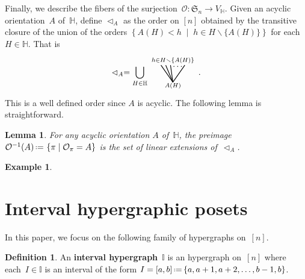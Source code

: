 \documentclass[reqno]{amsart}
\newtheorem{lemma}[theorem]{Lemma}
\theoremstyle{definition}
\newtheorem{definition}[theorem]{Definition}
\newtheorem{example}[theorem]{Example}
\newcommand{\set}[2]{\left\{ #1 \;\middle|\; #2 \right\}} %
\newcommand{\ssm}{\smallsetminus} %
\newcommand{\eqdef}{\mbox{\,\raisebox{0.2ex}{\scriptsize\ensuremath{\mathrm:}}\ensuremath{=}\,}} %
\newcommand{\defn}[1]{\textbf{\textsf{\color{PineGreen} #1}}} %
\newcommand{\vincent}[1]{\todo[size=\tiny,color=blue!30]{ #1 \\ \hfill --- V.}\,}
\newcommand{\fS}{\mathfrak{S}} %
\newcommand{\less}{\vartriangleleft} %
\newcommand{\Or}{\mathcal O}  %
\newcommand{\HH}{\mathbb H}  %
\newcommand{\II}{\mathbb I} %
\begin{document}
Finally, we describe the fibers of the surjection~$\Or : \fS_n \to V_\HH$.
Given an acyclic orientation~$A$ of~$\HH$, define $\less_A$ as the order on $[n]$ obtained by the transitive closure of the union of the \linebreak orders $\set{A(H) < h}{h \in H \ssm \{A(H)\}}$ for each $H \in \HH$.
That is
\[
	\less_A =  \bigcup_{H \in \HH} 
	\begin{tikzpicture}[scale=1,baseline=.0cm]
		\node at (0,-.45) {$\scriptstyle A(H)$};
		\node at (0,.6) {$\scriptstyle h \in H \ssm \{A(H)\}$};
		\node at (.2,.35) {$\ldots$};
		\draw [thick] (0,-.3)--(-.5,.4); 
		\draw [thick] (0,-.3)--(-.3,.4); 
		\draw [thick] (0,-.3)--(-.1,.4); 
		\draw [thick] (0,-.3)--(.5,.4); 
	\end{tikzpicture} \,.
\]
This is a well defined order since $A$ is acyclic.
The following lemma is straightforward.

\begin{lemma}
\label{lem:prepi}
For any acyclic orientation $A$ of~$\HH$, the preimage $\Or^{-1}(A) \eqdef \set{\pi}{\Or_\pi=A}$ is the set of linear extensions of~$\less_A$.
\end{lemma}

\begin{example}
\vincent{todo}
\end{example}




\section{Interval hypergraphic posets}
\label{sec:IHP}

In this paper, we focus on the following family of hypergraphs on~$[n]$.

\begin{definition}
An \defn{interval hypergraph}~$\II$ is an hypergraph on~$[n]$ where each~$I \in \II$ is an interval of the form $I = [a,b] \eqdef \{a, a+1, a+2, \dots, b-1, b\}$.
\end{definition}
\end{document}
